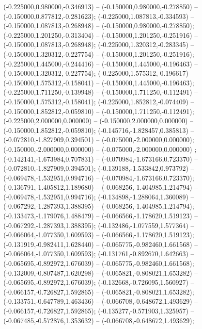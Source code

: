  (-0.225000,0.980000,-0.346913) -- (-0.150000,0.980000,-0.278850) -- (-0.150000,0.877812,-0.281623);
 (-0.225000,1.087813,-0.334593) -- (-0.150000,1.087813,-0.268948) -- (-0.150000,0.980000,-0.278850);
 (-0.225000,1.201250,-0.313404) -- (-0.150000,1.201250,-0.251916) -- (-0.150000,1.087813,-0.268948);
 (-0.225000,1.320312,-0.283345) -- (-0.150000,1.320312,-0.227754) -- (-0.150000,1.201250,-0.251916);
 (-0.225000,1.445000,-0.244416) -- (-0.150000,1.445000,-0.196463) -- (-0.150000,1.320312,-0.227754);
 (-0.225000,1.575312,-0.196617) -- (-0.150000,1.575312,-0.158041) -- (-0.150000,1.445000,-0.196463);
 (-0.225000,1.711250,-0.139948) -- (-0.150000,1.711250,-0.112491) -- (-0.150000,1.575312,-0.158041);
 (-0.225000,1.852812,-0.074409) -- (-0.150000,1.852812,-0.059810) -- (-0.150000,1.711250,-0.112491);
 (-0.225000,2.000000,0.000000) -- (-0.150000,2.000000,0.000000) -- (-0.150000,1.852812,-0.059810);
 (-0.145716,-1.828457,0.385813) -- (-0.072810,-1.827909,0.394501) -- (-0.075000,-2.000000,0.000000);
 (-0.150000,-2.000000,0.000000) -- (-0.075000,-2.000000,0.000000) ;
 (-0.142141,-1.673984,0.707831) -- (-0.070984,-1.673166,0.723370) -- (-0.072810,-1.827909,0.394501);
 (-0.139188,-1.533842,0.973792) -- (-0.069478,-1.532951,0.994716) -- (-0.070984,-1.673166,0.723370);
 (-0.136791,-1.405812,1.189680) -- (-0.068256,-1.404985,1.214794) -- (-0.069478,-1.532951,0.994716);
 (-0.134898,-1.288064,1.360089) -- (-0.067292,-1.287393,1.388395) -- (-0.068256,-1.404985,1.214794);
 (-0.133473,-1.179076,1.488479) -- (-0.066566,-1.178620,1.519123) -- (-0.067292,-1.287393,1.388395);
 (-0.132486,-1.077559,1.577364) -- (-0.066064,-1.077350,1.609593) -- (-0.066566,-1.178620,1.519123);
 (-0.131919,-0.982411,1.628440) -- (-0.065775,-0.982460,1.661568) -- (-0.066064,-1.077350,1.609593);
 (-0.131761,-0.892670,1.642663) -- (-0.065695,-0.892972,1.676039) -- (-0.065775,-0.982460,1.661568);
 (-0.132009,-0.807487,1.620298) -- (-0.065821,-0.808021,1.653282) -- (-0.065695,-0.892972,1.676039);
 (-0.132668,-0.726095,1.560927) -- (-0.066157,-0.726827,1.592865) -- (-0.065821,-0.808021,1.653282);
 (-0.133751,-0.647789,1.463436) -- (-0.066708,-0.648672,1.493629) -- (-0.066157,-0.726827,1.592865);
 (-0.135277,-0.571903,1.325957) -- (-0.067485,-0.572876,1.353632) -- (-0.066708,-0.648672,1.493629);
